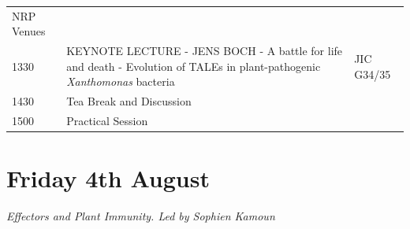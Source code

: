 \documentclass[12pt,]{book}
\theoremstyle{definition}
\theoremstyle{definition}
\theoremstyle{remark}
\begin{document}
\begin{longtable}[]{@{}lll@{}}
\begin{minipage}[t]{0.13\columnwidth}
NRP Venues\strut
\end{minipage}\tabularnewline
\begin{minipage}[t]{0.09\columnwidth}\raggedright\strut
1330\strut
\end{minipage} & \begin{minipage}[t]{0.39\columnwidth}\raggedright\strut
KEYNOTE LECTURE - JENS BOCH - A battle for life and death - Evolution of
TALEs in plant-pathogenic \emph{Xanthomonas} bacteria\strut
\end{minipage} & \begin{minipage}[t]{0.13\columnwidth}\raggedright\strut
JIC G34/35\strut
\end{minipage}\tabularnewline
\begin{minipage}[t]{0.09\columnwidth}\raggedright\strut
1430\strut
\end{minipage} & \begin{minipage}[t]{0.39\columnwidth}\raggedright\strut
Tea Break and Discussion\strut
\end{minipage} & \begin{minipage}[t]{0.13\columnwidth}\raggedright\strut
\strut
\end{minipage}\tabularnewline
\begin{minipage}[t]{0.09\columnwidth}\raggedright\strut
1500\strut
\end{minipage} & \begin{minipage}[t]{0.39\columnwidth}\raggedright\strut
Practical Session\strut
\end{minipage} & \begin{minipage}[t]{0.13\columnwidth}\raggedright\strut
\strut
\end{minipage}\tabularnewline
\bottomrule
\end{longtable}

\section*{Friday 4th August}\label{friday-4th-august}

\emph{Effectors and Plant Immunity. Led by Sophien Kamoun}
\end{document}
